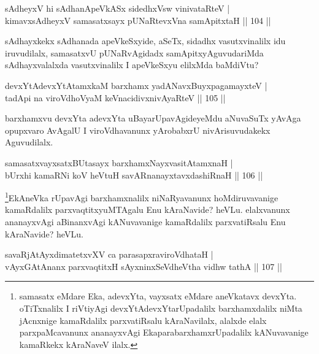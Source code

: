 \begin{shl}
sAdheyxV hi sAdhanApeVkASx sidedhxV\s sw vinivataRteV  | \\
kimavxsAdheyxV samasatxsayx pUNaRtevxVna samApitxtaH \hfill||  104 ||  
\end{shl}

\begin{artha}
sAdhayxkekx sAdhanada apeVkeSxyide, aSeTx, sidadhx vasutxvinalilx idu iruvudilalx, samasatxvU pUNaRvAgidadx samApitxyAguvudariMda sAdhayxvalalxda vasutxvinalilx I apeVkeSxyu elilxMda baMdiVtu?
\end{artha}

\begin{shl}
devxYtAdevxYtAtamxkaM barxhamx yadA\s NavxBuyxpagamayxteV   | \\
tadA\s pi na viroVdhoV\s yaM keVnacidivxnivAyaRteV \hfill||  105 ||  
\end{shl}

\begin{artha}
barxhamxvu devxYta adevxYta uBayarUpavAgideyeMdu aNuvaSuTx yAvAga opupxvaro AvAgalU I viroVdhavanunx yArobabxrU nivArisuvudakekx Aguvudilalx.
\end{artha}

\begin{shl}
samasatxvayxsatxBUtasayx barxhamxNayxvasitAtamxnaH  | \\
bUrxhi kamaRNi koV heVtuH savARnanayxtavxdashiRnaH \hfill||  106 ||  
\end{shl}

\begin{artha}
\footnote{samasatx eMdare Eka, adevxYta, vayxsatx eMdare aneVkatavx devxYta. oTiTxnalilx I riVtiyAgi devxYtAdevxYtarUpadalilx barxhamxdalilx niMta jAcnxnige kamaRdalilx parxvatiRsalu kAraNavilalx, alalxde elalx parxpaMcavanunx ananayxvAgi EkaparabarxhamxrUpadalilx kANuvavanige kamaRkekx kAraNaveV ilalx.}EkAneVka rUpavAgi barxhamxnalilx niNaRyavanunx hoMdiruvavanige kamaRdalilx parxvaqtitxyuMTAgalu Enu kAraNavide? heVLu. elalxvanunx ananayxvAgi aBinanxvAgi kANuvavanige kamaRdalilx parxvatiRsalu Enu kAraNavide? heVLu.
\end{artha}

\begin{shl}
savaRjAtAyxdimatetxvXV ca parasapxraviroVdhataH  | \\
vAyxGAtAnanx parxvaqtitxH sAyxninxSeVdheV\s tha vidhw tathA \hfill||  107 ||  
\end{shl}

